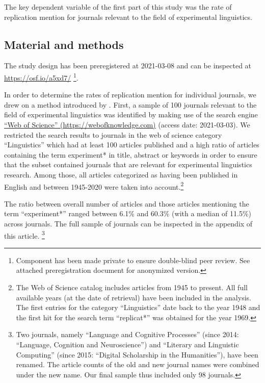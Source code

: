 \documentclass[cm,linguex]{glossa}
\begin{document}
The key dependent variable of the first part of this study was the rate of replication mention for journals relevant to the field of experimental linguistics.

\hypertarget{material-and-methods}{%
\subsection{Material and methods}\label{material-and-methods}}

The study design has been preregistered at 2021-03-08 and can be inspected at \url{https://osf.io/a5xd7/} \footnote{Component has been made private to ensure double-blind peer review. See attached preregistration document for anonymized version.}.

In order to determine the rates of replication mention for individual journals, we drew on a method introduced by \citet{makel_replications_2012}.
First, a sample of 100 journals relevant to the field of experimental linguistics was identified by making use of the search engine \href{https://webofknowledge.com}{``Web of Science'' (https://webofknowledge.com)} (access date: 2021-03-03). We restricted the search results to journals in the web of science category ``Linguistics'' which had at least 100 articles published and a high ratio of articles containing the term experiment* in title, abstract or keywords in order to ensure that the subset contained journals that are relevant for experimental linguistics research. Among those, all articles categorized as having been published in English and between 1945-2020 were taken into account.\footnote{The Web of Science catalog includes articles from 1945 to present. All full available years (at the date of retrieval) have been included in the analysis. The first entries for the category ``Linguistics'' date back to the year 1948 and the first hit for the search term ``replicat*'' was obtained for the year 1969.}

The ratio between overall number of articles and those articles mentioning the term ``experiment*'' ranged between 6.1\% and 60.3\% (with a median of 11.5\%) across journals.
The full sample of journals can be inspected in the appendix of this article. \footnote{Two journals, namely ``Language and Cognitive Processes'' (since 2014: ``Language, Cognition and Neuroscience'') and ``Literary and Linguistic Computing'' (since 2015: ``Digital Scholarship in the Humanities''), have been renamed. The article counts of the old and new journal names were combined under the new name. Our final sample thus included only 98 journals.}
\end{document}
